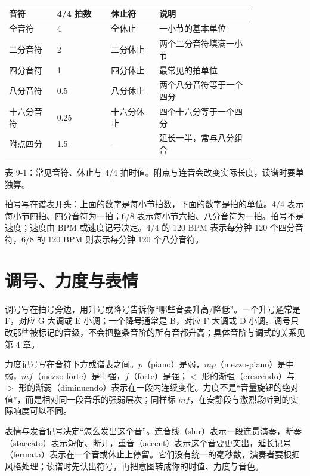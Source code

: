 \begin{center}
\small
\begin{tabular}{p{0.16\linewidth}p{0.18\linewidth}p{0.16\linewidth}p{0.32\linewidth}}
\toprule
音符 & 4/4 拍数 & 休止符 & 说明 \\
\midrule
全音符 & 4 & 全休止 & 一小节的基本单位 \\
二分音符 & 2 & 二分休止 & 两个二分音符填满一小节 \\
四分音符 & 1 & 四分休止 & 最常见的拍单位 \\
八分音符 & 0.5 & 八分休止 & 两个八分音符等于一个四分 \\
十六分音符 & 0.25 & 十六分休止 & 四个十六分等于一个四分 \\
附点四分 & 1.5 & --- & 延长一半，常与八分组合 \\
\bottomrule
\end{tabular}

表 9-1：常见音符、休止与 4/4 拍时值。附点与连音会改变实际长度，读谱时要单独算。
\end{center}

拍号写在谱表开头：上面的数字是每小节拍数，下面的数字是拍的单位。4/4 表示每小节四拍、四分音符为一拍；6/8 表示每小节六拍、八分音符为一拍。拍号不是速度；速度由 BPM 或速度记号决定。4/4 的 120 BPM 表示每分钟 120 个四分音符，6/8 的 120 BPM 则表示每分钟 120 个八分音符。

\section{调号、力度与表情}

调号写在拍号旁边，用升号或降号告诉你“哪些音要升高/降低”。一个升号通常是 F\sharpsym，对应 G 大调或 E 小调；一个降号通常是 B\flatsym，对应 F 大调或 D 小调。调号只改那些被标记的音级，不会把整条音阶的所有音都升高；具体音阶与调式的关系见第 4 章。

力度记号写在音符下方或谱表之间。$p$（piano）是弱，$mp$（mezzo-piano）是中弱，$mf$（mezzo-forte）是中强，$f$（forte）是强；$<$ 形的渐强（crescendo）与 $>$ 形的渐弱（diminuendo）表示在一段内连续变化。力度不是“音量旋钮的绝对值”，而是相对同一段音乐的强弱层次；同样标 $mf$，在安静段与激烈段听到的实际响度可以不同。

表情与发音记号决定“怎么发出这个音”。连音线（slur）表示一段连贯演奏，断奏（staccato）表示短促、断开，重音（accent）表示这个音要更突出，延长记号（fermata）表示在一个音或休止上停留。它们没有统一的毫秒数，演奏者要根据风格处理；读谱时先认出符号，再把意图转成你的时值、力度与音色。

